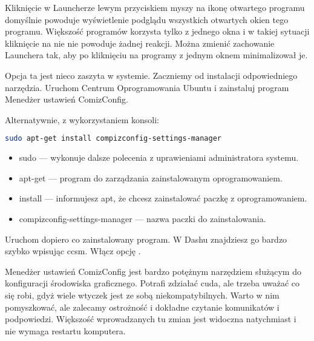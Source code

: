 Kliknięcie w Launcherze lewym przyciskiem myszy na ikonę otwartego programu domyślnie powoduje wyświetlenie podglądu wszystkich otwartych okien tego programu. Większość programów korzysta tylko z jednego okna i w takiej sytuacji kliknięcie na nie nie powoduje żadnej reakcji. Można zmienić zachowanie Launchera tak, aby po kliknięciu na programy z jednym oknem minimalizował je.

Opcja ta jest nieco zaszyta w systemie. Zaczniemy od instalacji odpowiedniego narzędzia. Uruchom \textcolor{ubuntu_orange}{Centrum Oprogramowania Ubuntu} i zainstaluj program \textcolor{ubuntu_orange}{Menedżer ustawień ComizConfig}.

Alternatywnie, z wykorzystaniem konsoli:
\begin{lstlisting}[language=bash]
sudo apt-get install compizconfig-settings-manager
\end{lstlisting}
\begin{itemize}
\item \textcolor{ubuntu_orange}{sudo} --- wykonuje dalsze polecenia z uprawieniami administratora systemu.
\item \textcolor{ubuntu_orange}{apt-get} --- program do zarządzania zainstalowanym oprogramowaniem.
\item \textcolor{ubuntu_orange}{install} --- informujesz apt, że chcesz zainstalować paczkę z oprogramowaniem.
\item \textcolor{ubuntu_orange}{compizconfig-settings-manager} --- nazwa paczki do zainstalowania.
\end{itemize}
Uruchom dopiero co zainstalowany program. W Dashu znajdziesz go bardzo szybko wpisując \textcolor{ubuntu_orange}{ccsm}. Włącz opcję .

Menedżer ustawień ComizConfig jest bardzo potężnym narzędziem służącym do konfiguracji środowiska graficznego. Potrafi zdziałać cuda, ale trzeba uważać co się robi, gdyż wiele wtyczek jest ze sobą niekompatybilnych. Warto w nim pomyszkować, ale zalecamy ostrożność i dokładne czytanie komunikatów i podpowiedzi. Większość wprowadzanych tu zmian jest widoczna natychmiast i nie wymaga restartu komputera.